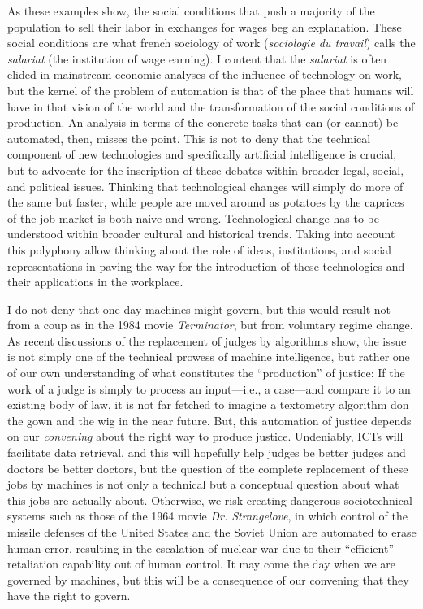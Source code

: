 \documentclass[version=last,draft=false,paper=A4,portrait,twoside=true,twocolumn=false,headinclude=false,footinclude=false,mpinclude=true,fontsize=12,BCOR=20mm,DIV=calc,pagesize=auto,open=right,chapterprefix=true,numbers=autoendperiod,headsepline=false,headings=twolinechapter,parskip=false]{scrbook}
\begin{document}
As these examples show, the social conditions that push a majority of the
population to sell their labor in exchanges for wages beg an explanation.
These social conditions are what french sociology of work (\emph{sociologie du
travail}) calls the \emph{salariat} (the institution of wage earning). I content
that the \emph{salariat} is often elided in mainstream economic analyses of the
influence of technology on work, but the kernel of the problem of
automation is that of the place that humans will have in that vision of the
world and the transformation of the social conditions of production. An
analysis in terms of the concrete tasks that can (or cannot) be automated,
then, misses the point. This is not to deny that the technical component of
new technologies and specifically artificial intelligence is crucial, but
to advocate for the inscription of these debates within broader legal,
social, and political issues. Thinking that technological changes will
simply do more of the same but faster, while people are moved around as
potatoes by the caprices of the job market is both naive and wrong.
Technological change has to be understood within broader cultural and
historical trends. Taking into account this polyphony allow thinking about
the role of ideas, institutions, and social representations in paving the
way for the introduction of these technologies and their applications in the
workplace.

I do not deny that one day machines might govern, but this would result not
from a coup as in the 1984 movie \emph{Terminator}, but from voluntary regime
change. As recent discussions of the replacement of judges by algorithms
show, the issue is not simply one of the technical prowess of machine
intelligence, but rather one of our own understanding of what constitutes
the ``production'' of justice: If the work of a judge is simply to process
an input---i.e., a case---and compare it to an existing body of law, it is
not far fetched to imagine a textometry algorithm don the gown and the wig
in the near future. But, this automation of justice depends on our
\emph{convening} about the right way to produce justice. Undeniably, ICTs will
facilitate data retrieval, and this will hopefully help judges be better
judges and doctors be better doctors, but the question of the complete
replacement of these jobs by machines is not only a technical but a
conceptual question about what this jobs are actually about. Otherwise, we
risk creating dangerous sociotechnical systems such as those of the 1964
movie \emph{Dr. Strangelove}, in which control of the missile defenses of the
United States and the Soviet Union are automated to erase human error,
resulting in the escalation of nuclear war due to their ``efficient''
retaliation capability out of human control. It may come the day when we
are governed by machines, but this will be a consequence of our convening
that they have the right to govern.
\end{document}
